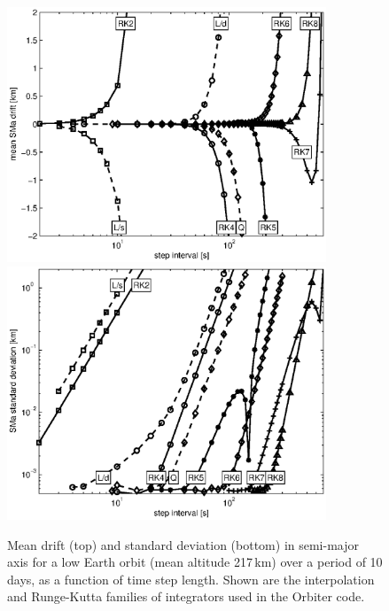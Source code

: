 \documentclass[Orbiter Technical Reference.tex]{subfiles}
\begin{document}
\begin{figure}[H]\centering
\includegraphics[width=0.85\textwidth]{sma_dev}
\includegraphics[width=0.85\textwidth]{sma_std}
\caption{Mean drift (top) and standard deviation (bottom) in semi-major axis for a low Earth orbit (mean altitude 217\,km) over a period of 10 days, as a function of time step length. Shown are the interpolation and Runge-Kutta families of integrators used in the Orbiter code.}
\label{fig:1day_err}
\end{figure}
\end{document}
